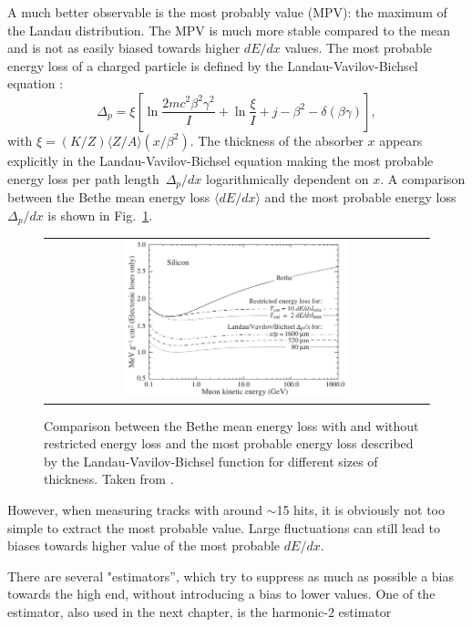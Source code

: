 A much better observable is the most probably value (MPV): the maximum of the Landau distribution.
The MPV is much more stable compared to the mean and is not as easily biased towards higher $dE/dx$ values. 
The most probable energy loss of a charged particle is defined by the Landau-Vavilov-Bichsel equation \cite{bib:Bichsel:MPV_1988}:
\begin{equation}
\Delta_p = \xi \left[ \ln \frac{2mc^2\beta^2\gamma^2}{I}  + \ln\frac{\xi}{I} + j - \beta^2 - \delta(\beta\gamma)  \right],
\label{eq:Landau_Vavilov_Bichsel}
\end{equation}
with $\xi=(K/Z)\langle Z/A \rangle (x/\beta^2)$. 
The thickness of the absorber $x$ appears explicitly in the Landau-Vavilov-Bichsel equation making the most probable energy loss per path \mbox{length $\Delta_p/dx$} logarithmically dependent on $x$.
A comparison between the Bethe mean energy loss $\langle dE/dx \rangle$ and the most probable energy loss $\Delta_p/dx$ is shown in Fig.~\ref{fig:dEdx_Bethe_Landau}.
\begin{figure}[!bt]
  \centering 
  \begin{tabular}{c}
  \includegraphics[width=0.6\textwidth]{figures/analysis/dEdx_Bethe_Landau.png}
  \end{tabular}
  \caption{Comparison between the Bethe mean energy loss with and without restricted energy loss and the most probable energy loss described by the Landau-Vavilov-Bichsel function for different sizes of thickness. 
           Taken from \cite{bib:PDG_2014}.} 
  \label{fig:dEdx_Bethe_Landau}
\end{figure}
However, when measuring tracks with around $\sim$15 hits, it is obviously not too simple to extract the most probable value. 
Large fluctuations can still lead to biases towards higher value of the most probable $dE/dx$.

There are several "estimators'', which try to suppress as much as possible a bias towards the high end, without introducing a bias to lower values.
One of the estimator, also used in the next chapter, is the harmonic-2 estimator

